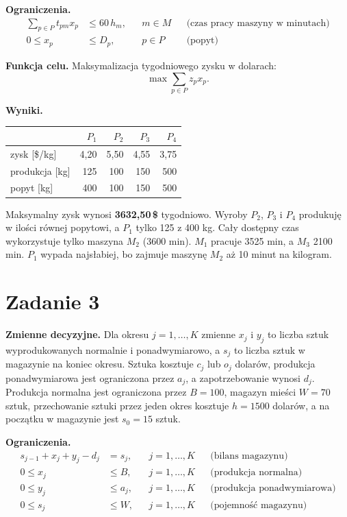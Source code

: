 \documentclass[11pt,a4paper]{article}
\begin{document}
\textbf{Ograniczenia.}
\begin{align*}
\sum_{p\in P} t_{pm}x_p &\le 60\,h_m, && m\in M && \text{(czas pracy maszyny w minutach)}\\
0\le x_p &\le D_p, && p\in P && \text{(popyt)}
\end{align*}

\textbf{Funkcja celu.} Maksymalizacja tygodniowego zysku w dolarach:
\[ \max \sum_{p\in P} z_p x_p. \]

\textbf{Wyniki.}
\begin{center}
\begin{tabular}{@{}lrrrr@{}}
\toprule
 & $P_1$ & $P_2$ & $P_3$ & $P_4$ \\ \midrule
zysk [\$/kg] & 4,20 & 5,50 & 4,55 & 3,75 \\
produkcja [kg] & 125 & 100 & 150 & 500 \\
popyt [kg] & 400 & 100 & 150 & 500 \\
\bottomrule
\end{tabular}
\end{center}

Maksymalny zysk wynosi \textbf{3632,50\,\$} tygodniowo. Wyroby $P_2$, $P_3$ i $P_4$ produkuję w ilości równej popytowi, a $P_1$ tylko 125 z 400 kg.
Cały dostępny czas wykorzystuje tylko maszyna $M_2$ (3600 min). $M_1$ pracuje 3525 min, a $M_3$ 2100 min. $P_1$ wypada najsłabiej, bo zajmuje maszynę $M_2$ aż 10 minut na kilogram.

\section*{Zadanie 3}
\textbf{Zmienne decyzyjne.} Dla okresu $j=1,\dots,K$ zmienne $x_j$ i $y_j$ to liczba sztuk wyprodukowanych normalnie i ponadwymiarowo, a $s_j$ to liczba sztuk w magazynie na koniec okresu.
Sztuka kosztuje $c_j$ lub $o_j$ dolarów, produkcja ponadwymiarowa jest ograniczona przez $a_j$, a zapotrzebowanie wynosi $d_j$. Produkcja normalna jest ograniczona przez $B=100$, magazyn mieści $W=70$ sztuk, przechowanie sztuki przez jeden okres kosztuje $h=1500$ dolarów, a na początku w magazynie jest $s_0=15$ sztuk.

\textbf{Ograniczenia.}
\begin{align*}
s_{j-1}+x_j+y_j-d_j &= s_j, && j=1,\dots,K && \text{(bilans magazynu)}\\
0\le x_j &\le B, && j=1,\dots,K && \text{(produkcja normalna)}\\
0\le y_j &\le a_j, && j=1,\dots,K && \text{(produkcja ponadwymiarowa)}\\
0\le s_j &\le W, && j=1,\dots,K && \text{(pojemność magazynu)}
\end{align*}
\end{document}

